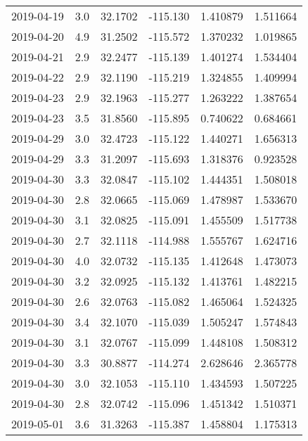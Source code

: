 \begin{tabular}{lrrrrr}
2019-04-19 &       3.0 &  32.1702 &  -115.130 &         1.410879 &         1.511664 \\
2019-04-20 &       4.9 &  31.2502 &  -115.572 &         1.370232 &         1.019865 \\
2019-04-21 &       2.9 &  32.2477 &  -115.139 &         1.401274 &         1.534404 \\
2019-04-22 &       2.9 &  32.1190 &  -115.219 &         1.324855 &         1.409994 \\
2019-04-23 &       2.9 &  32.1963 &  -115.277 &         1.263222 &         1.387654 \\
2019-04-23 &       3.5 &  31.8560 &  -115.895 &         0.740622 &         0.684661 \\
2019-04-29 &       3.0 &  32.4723 &  -115.122 &         1.440271 &         1.656313 \\
2019-04-29 &       3.3 &  31.2097 &  -115.693 &         1.318376 &         0.923528 \\
2019-04-30 &       3.3 &  32.0847 &  -115.102 &         1.444351 &         1.508018 \\
2019-04-30 &       2.8 &  32.0665 &  -115.069 &         1.478987 &         1.533670 \\
2019-04-30 &       3.1 &  32.0825 &  -115.091 &         1.455509 &         1.517738 \\
2019-04-30 &       2.7 &  32.1118 &  -114.988 &         1.555767 &         1.624716 \\
2019-04-30 &       4.0 &  32.0732 &  -115.135 &         1.412648 &         1.473073 \\
2019-04-30 &       3.2 &  32.0925 &  -115.132 &         1.413761 &         1.482215 \\
2019-04-30 &       2.6 &  32.0763 &  -115.082 &         1.465064 &         1.524325 \\
2019-04-30 &       3.4 &  32.1070 &  -115.039 &         1.505247 &         1.574843 \\
2019-04-30 &       3.1 &  32.0767 &  -115.099 &         1.448108 &         1.508312 \\
2019-04-30 &       3.3 &  30.8877 &  -114.274 &         2.628646 &         2.365778 \\
2019-04-30 &       3.0 &  32.1053 &  -115.110 &         1.434593 &         1.507225 \\
2019-04-30 &       2.8 &  32.0742 &  -115.096 &         1.451342 &         1.510371 \\
2019-05-01 &       3.6 &  31.3263 &  -115.387 &         1.458804 &         1.175313 \\

\end{tabular}
